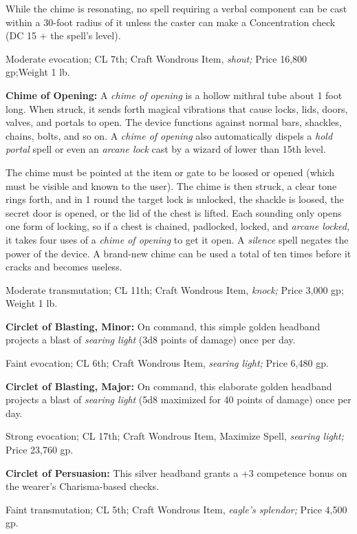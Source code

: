 \documentclass{article}
\begin{document}
While the chime is resonating, no spell requiring a verbal component can be cast 
within a 30-foot radius of it unless the caster can make a Concentration check 
(DC 15 + the spell's level).

Moderate evocation; CL 7th; Craft Wondrous Item, \textit{shout; }Price 16,800 gp;Weight 
1 lb.

\textbf{Chime of Opening:} A \textit{chime of opening }is a hollow mithral tube 
about 1 foot long. When struck, it sends forth magical vibrations that cause locks, 
lids, doors, valves, and portals to open. The device functions against normal bars, 
shackles, chains, bolts, and so on. A \textit{chime of opening }also automatically 
dispels a \textit{hold portal }spell or even an \textit{arcane lock }cast by a 
wizard of lower than 15th level.

The chime must be pointed at the item or gate to be loosed or opened (which must 
be visible and known to the user). The chime is then struck, a clear tone rings 
forth, and in 1 round the target lock is unlocked, the shackle is loosed, the secret 
door is opened, or the lid of the chest is lifted. Each sounding only opens one 
form of locking, so if a chest is chained, padlocked, locked, and \textit{arcane 
locked, }it takes four uses of a \textit{chime of opening }to get it open. A \textit{silence 
}spell negates the power of the device. A brand-new chime can be used a total of 
ten times before it cracks and becomes useless.

Moderate transmutation; CL 11th; Craft Wondrous Item, \textit{knock; }Price 3,000 
gp; Weight 1 lb.

\textbf{Circlet of Blasting, Minor:} On command, this simple golden headband projects 
a blast of \textit{searing light }(3d8 points of damage) once per day.

Faint evocation; CL 6th; Craft Wondrous Item, \textit{searing light; }Price 6,480 
gp.

\textbf{Circlet of Blasting, Major:} On command, this elaborate golden headband 
projects a blast of \textit{searing light }(5d8 maximized for 40 points of damage) 
once per day.

Strong evocation; CL 17th; Craft Wondrous Item, Maximize Spell, \textit{searing 
light; }Price 23,760 gp.

\textbf{Circlet of Persuasion:} This silver headband grants a +3 competence bonus 
on the wearer's Charisma-based checks.

Faint transmutation; CL 5th; Craft Wondrous Item, \textit{eagle's splendor; }Price 
4,500 gp.
\end{document}
